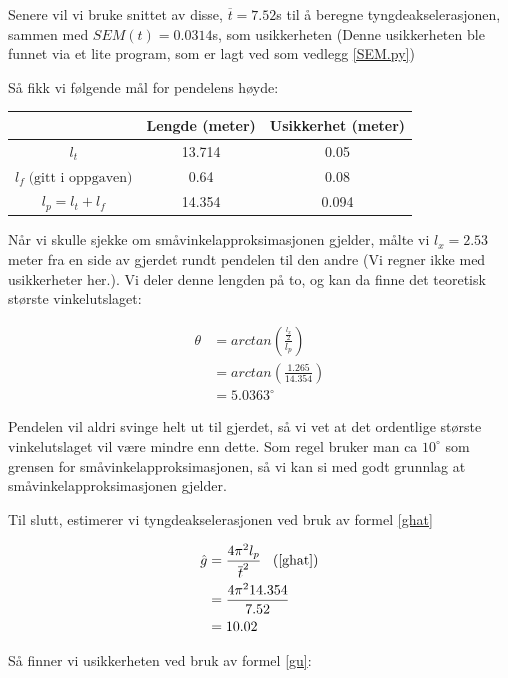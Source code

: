  Senere vil vi bruke snittet av disse, $\overline{t} = 7.52$s til å beregne tyngdeakselerasjonen, sammen med $SEM(t) = 0.0314$s, som usikkerheten (Denne usikkerheten ble funnet via et lite program, som er lagt ved som vedlegg \ref{SEM.py})
\medskip

Så fikk vi følgende mål for pendelens høyde:

\begin{center}
\begin{tabular}{ | c | c | c |}
    \hline
    & Lengde (meter) & Usikkerhet (meter)\\
    \hline
    $l_t$ & 13.714 & 0.05\\
    \hline
    $l_f \; \text{(gitt i oppgaven)}$ & 0.64  & 0.08\\
    \hline
    $l_p = l_t + l_f$ & 14.354 & 0.094\\
    \hline
\end{tabular}
\end{center}

Når vi skulle sjekke om småvinkelapproksimasjonen gjelder, målte vi $l_x = 2.53$ meter fra en side av gjerdet rundt pendelen til den andre (Vi regner ikke med usikkerheter her.). Vi deler denne lengden på to, og kan da finne det teoretisk største vinkelutslaget:

\begin{align*}
    \theta &= arctan\left(\frac{\frac{l_x}{2}}{l_p}\right)\\
    &= arctan\left(\frac{1.265}{14.354}\right)\\
    &= 5.0363^{\circ}
\end{align*}

Pendelen vil aldri svinge helt ut til gjerdet, så vi vet at det ordentlige største vinkelutslaget vil være mindre enn dette. Som regel bruker man ca $10^{\circ}$ som grensen for småvinkelapproksimasjonen, så vi kan si med godt grunnlag at småvinkelapproksimasjonen gjelder.\bigskip

Til slutt, estimerer vi tyngdeakselerasjonen ved bruk av formel \ref{ghat}

\begin{align*}
    \hat{g} &= \frac{4\pi^2l_p}{\overline{t}^2} \alignref{ghat}\\
    &= \frac{4\pi^214.354}{7.52}\\
    &= 10.02
\end{align*}

Så finner vi usikkerheten ved bruk av formel \ref{gu}:


